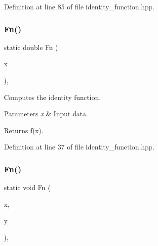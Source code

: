 Definition at line 85 of file identity\+\_\+function.\+hpp.

\mbox{\label{classmlpack_1_1ann_1_1IdentityFunction_a11bd9a1195e6b107f9fee73643bc328b}} 
\subsubsection{Fn()\hspace{0.1cm}{\footnotesize\ttfamily [1/2]}}
{\footnotesize\ttfamily static double Fn (\begin{DoxyParamCaption}\item[{const double}]{x }\end{DoxyParamCaption})\hspace{0.3cm}{\ttfamily [inline]}, {\ttfamily [static]}}



Computes the identity function. 


\begin{DoxyParams}{Parameters}
{\em x} & Input data. \\
\hline
\end{DoxyParams}
\begin{DoxyReturn}{Returns}
f(x). 
\end{DoxyReturn}


Definition at line 37 of file identity\+\_\+function.\+hpp.

\mbox{\label{classmlpack_1_1ann_1_1IdentityFunction_af6cf5da90eb6312e3e25c9b8bd9c3527}} 
\subsubsection{Fn()\hspace{0.1cm}{\footnotesize\ttfamily [2/2]}}
{\footnotesize\ttfamily static void Fn (\begin{DoxyParamCaption}\item[{const Input\+Vec\+Type \&}]{x,  }\item[{Output\+Vec\+Type \&}]{y }\end{DoxyParamCaption})\hspace{0.3cm}{\ttfamily [inline]}, {\ttfamily [static]}}



